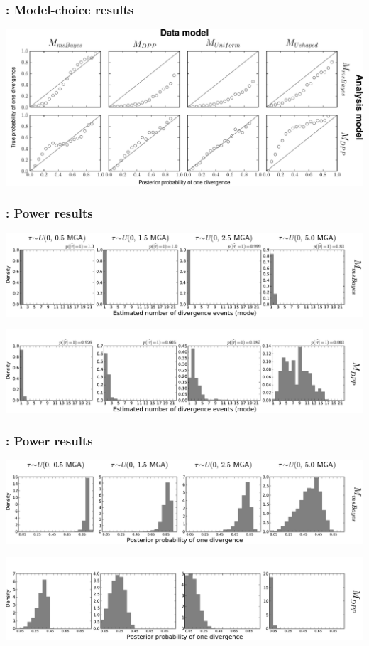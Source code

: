 \begin{frame}
    \frametitle{\dppmsbayes: Model-choice results}
    \centerline{
        \includegraphics[width=1.13\textwidth]{images/validation-model-choice-old-dpp-full.pdf}}
\end{frame}

\begin{frame}[t]
    \frametitle{\dppmsbayes: Power results}
    \vspace{1cm}
        \centerline{
        \includegraphics[width=1.13\textwidth]{images/old_old_power_psi_mode.pdf}}
        \vspace{0mm}
        \centerline{
        \includegraphics[width=1.13\textwidth]{images/old_dpp_power_psi_mode_headless.pdf}}
\end{frame}

\begin{frame}[t]
    \frametitle{\dppmsbayes: Power results}
    \vspace{1cm}
        \centerline{
        \includegraphics[width=1.13\textwidth]{images/old_old_power_psi_prob.pdf}}
        \vspace{0mm}
        \centerline{
        \includegraphics[width=1.13\textwidth]{images/old_dpp_power_psi_prob_headless.pdf}}
\end{frame}

